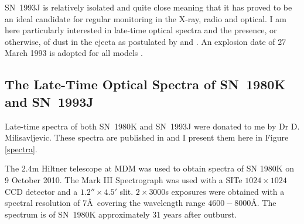 SN~1993J is relatively isolated and quite close meaning that it has proved to be an ideal candidate for regular monitoring in the X-ray, radio and optical.  I am here particularly interested in late-time optical spectra and the presence, or otherwise, of dust in the ejecta as postulated by \citet{Fransson2005} and \citep{Milisavljevic2012}.  An explosion date of 27 March 1993 is adopted for all models \citep{Baron1993}.

\subsection{The Late-Time Optical Spectra of SN~1980K and SN~1993J}

Late-time spectra of both SN~1980K and SN~1993J were donated to me by Dr D. Milisavljevic.  These spectra are published in \citet{Milisavljevic2012} and I present them here in Figure \ref{spectra}.

The 2.4m Hiltner telescope at MDM was used to obtain spectra of SN 1980K on 9 October 2010. The Mark III Spectrograph was used with a SITe $1024 \times 1024$ CCD detector and a $1.2'' \times 4.5'$ slit. $2 \times 3000$s exposures were obtained with a spectral resolution of 7\AA\  covering the wavelength range $4600-8000$\AA. The spectrum is of SN~1980K approximately 31 years after outburst.

